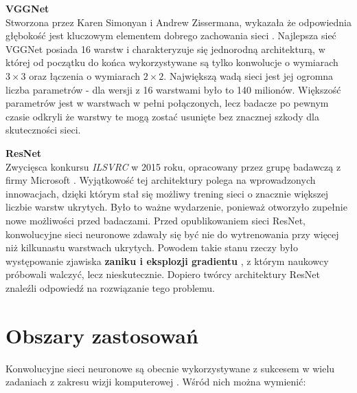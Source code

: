 \begin{enumerate*}
\item \textbf{VGGNet} \\
Stworzona przez Karen Simonyan i Andrew Zissermana, wykazała że odpowiednia głębokość jest kluczowym elementem dobrego zachowania sieci \cite{vggNet:article}. Najlepsza sieć VGGNet posiada 16 warstw i charakteryzuje się jednorodną architekturą, w której od początku do końca wykorzystywane są tylko konwolucje o wymiarach $3 \times 3$ oraz łączenia o wymiarach $2 \times 2$.  Największą wadą sieci jest jej ogromna liczba parametrów - dla wersji z 16 warstwami było to 140 milionów. Większość parametrów jest w warstwach w pełni połączonych, lecz badacze po pewnym czasie odkryli że warstwy te mogą zostać usunięte bez znacznej szkody dla skuteczności sieci.
\item \textbf{ResNet} \\
Zwycięsca konkursu \textit{ILSVRC} w 2015 roku, opracowany przez grupę badawczą z firmy Microsoft \cite{resnet:article}. Wyjątkowość tej architektury polega na wprowadzonych innowacjach, dzięki którym stał się możliwy trening sieci o znacznie większej liczbie warstw ukrytych. Było to ważne wydarzenie, ponieważ otworzyło zupełnie nowe możliwości przed badaczami. Przed opublikowaniem sieci ResNet, konwolucyjne sieci neuronowe zdawały się być nie do wytrenowania przy więcej niż kilkunastu warstwach ukrytych. Powodem takie stanu rzeczy było występowanie zjawiska \textbf{zaniku i eksplozji gradientu} \cite{bohra:vanishingGradient}, z którym naukowcy próbowali walczyć, lecz nieskutecznie. Dopiero twórcy architektury ResNet znaleźli odpowiedź na rozwiązanie tego problemu.
\end{enumerate*}

\section{Obszary zastosowań}
Konwolucyjne sieci neuronowe są obecnie wykorzystywane z sukcesem w wielu zadaniach z zakresu wizji komputerowej \cite{kumar:cnnApplications}. Wśród nich można wymienić:

